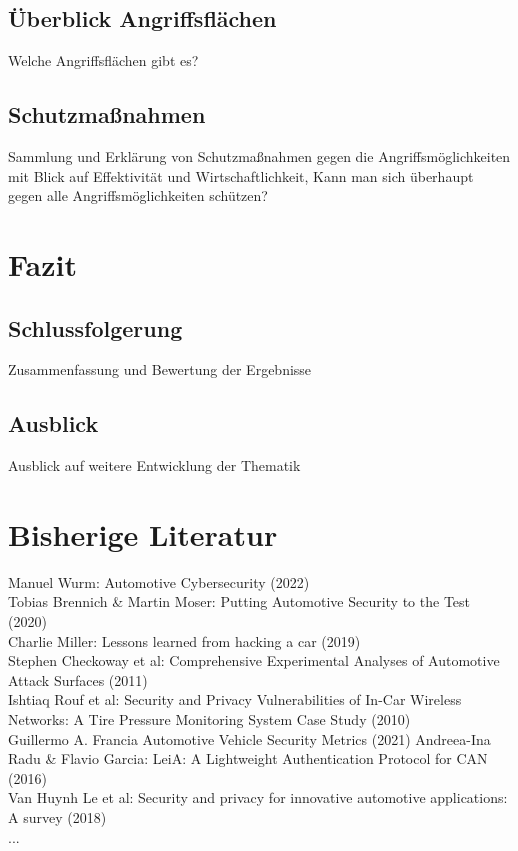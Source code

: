 \documentclass[
   ngerman          %
  ,a4paper          %
  ,12pt
  ,pdftex
]{article}
\begin{document}
\subsection{Überblick Angriffsflächen}
Welche Angriffsflächen gibt es?
\subsection{Schutzmaßnahmen}
Sammlung und Erklärung von Schutzmaßnahmen gegen die Angriffsmöglichkeiten mit Blick auf Effektivität und Wirtschaftlichkeit, Kann man sich überhaupt gegen alle Angriffsmöglichkeiten schützen?

\section{Fazit}
\subsection{Schlussfolgerung}
Zusammenfassung und Bewertung der Ergebnisse
\subsection{Ausblick}
Ausblick auf weitere Entwicklung der Thematik

\newpage
\section{Bisherige Literatur}
Manuel Wurm: Automotive Cybersecurity (2022) \\
Tobias Brennich \& Martin Moser: Putting Automotive Security to the Test (2020) \\
Charlie Miller: Lessons learned from hacking a car (2019) \\
Stephen Checkoway et al: Comprehensive Experimental Analyses of Automotive Attack Surfaces (2011) \\
Ishtiaq Rouf et al: Security and Privacy Vulnerabilities of In-Car Wireless Networks: A Tire Pressure  Monitoring System Case Study (2010) \\
Guillermo A. Francia Automotive Vehicle Security Metrics (2021)
Andreea-Ina Radu \& Flavio Garcia: LeiA: A Lightweight Authentication Protocol for CAN (2016) \\
Van Huynh Le et al: Security and privacy for innovative automotive applications: A survey (2018) \\
...

%
%
\end{document}
